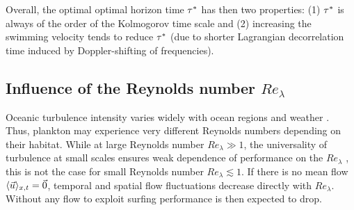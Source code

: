 Overall, the optimal optimal horizon time $\tau^*$ has then two properties: (1) $\tau^*$ is always of the order of the Kolmogorov time scale and (2) increasing the swimming velocity tends to reduce $\tau^*$ (due to shorter Lagrangian decorrelation time induced by Doppler-shifting of frequencies).

\subsection{Influence of the Reynolds number $\mathit{Re}_{\lambda}$}

Oceanic turbulence intensity varies widely with ocean regions and weather \citep{fuchs2016seascape}.
Thus, plankton may experience very different Reynolds numbers depending on their habitat.
While at large Reynolds number $\mathit{Re}_{\lambda} \gg 1$, the universality of turbulence at small scales ensures weak dependence of performance on the $\mathit{Re}_{\lambda}$ \citep{frisch1995turbulence}, this is not the case for small Reynolds number $\mathit{Re}_{\lambda} \lesssim 1$.
If there is no mean flow $\langle \vec{u} \rangle_{x,t} = \vec{0}$, temporal and spatial flow fluctuations decrease directly with $\mathit{Re}_{\lambda}$. 
Without any flow to exploit surfing performance is then expected to drop.

